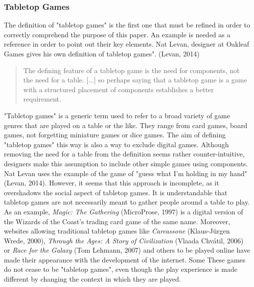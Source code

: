 \subsubsection{Tabletop Games}
The definition of "tabletop games" is the first one that must be refined in order to correctly comprehend the purpose of this paper. An example is needed as a reference in order to point out their key elements. Nat Levan, designer at Oakleaf Games gives his own definition of tabletop games". (Levan, 2014)
\begin{quotation}
The defining feature of a tabletop game is the need for components, not the need for a table. [...] so perhaps saying that a tabletop game is a game with a structured placement of components establishes a better requirement.
\end{quotation} 
"Tabletop games" is a generic term used to refer to a broad variety of game genres that are played on a table or the like. They range from card games, board games, not forgetting miniature games or dice games. The aim of defining "tabletop games" this way is also a way to exclude digital games. Although removing the need for a table from the definition seems rather counter-intuitive, designers make this assumption to include other simple games using components. Nat Levan uses the example of the game of "guess what I’m holding in my hand"(Levan, 2014). However, it seems that this approach is incomplete, as it overshadows the social aspect of tabletop games. It is understandable that tabletop games are not necessarily meant to gather people around a table to play. As an example, \textit{Magic: The Gathering} (MicroProse, 1997) is a digital version of the Wizards of the Coast’s trading card game of the same name. Moreover, websites allowing traditional tabletop games like \textit{Carcassone} (Klaus-Jürgen Wrede, 2000), \textit{Through the Ages: A Story of Civilization} (Vlaada Chvátil, 2006) or \textit{Race for the Galaxy} (Tom Lehmann, 2007) and others to be played online have made their appearance with the development of the internet. Some These games do not cease to be "tabletop games", even though the play experience is made different by changing the context in which they are played.


